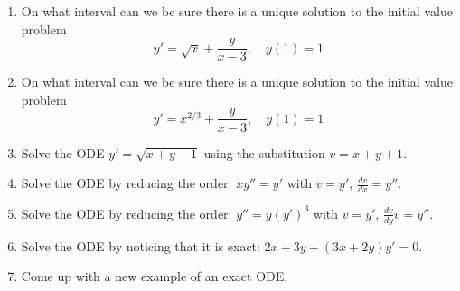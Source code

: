 \documentclass[12pt]{article}
\begin{document}
\begin{enumerate}
 \item On what interval can we be sure there is a unique solution to the initial value problem
 $$y'=\sqrt x+\frac{y}{x-3},\quad y(1)=1$$
 
 \item On what interval can we be sure there is a unique solution to the initial value problem
 $$y'=x^{2/3}+\frac{y}{x-3},\quad y(1)=1$$
 
 \item Solve the ODE $y'=\sqrt{x+y+1}$ using the substitution $v=x+y+1$.
 
 \item Solve the ODE by reducing the order: $xy''=y'$ with $v=y'$, $\frac{dv}{dx}=y''$.
 
 \item Solve the ODE by reducing the order: $y''=y(y')^3$ with $v=y'$, $\frac{dv}{dy}v=y''$.
 
 \item Solve the ODE by noticing that it is exact: $2x+3y+(3x+2y)y'=0$.
 
 \item Come up with a new example of an exact ODE.
 
 \end{enumerate}
\end{document}
